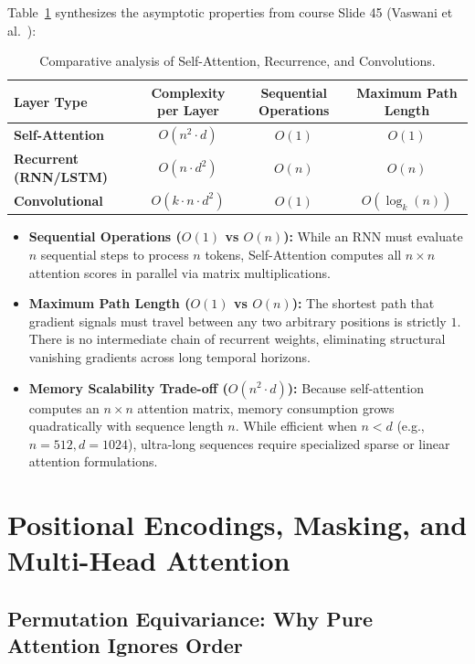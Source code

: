 Table~\ref{tab:layer_comparison} synthesizes the asymptotic properties from course Slide 45 (Vaswani et al.~\cite{vaswani2017attention}):

\begin{table}[htbp]
\centering
\small
\renewcommand{\arraystretch}{1.2}
\begin{tabular}{l c c c}
\toprule
\textbf{Layer Type} & \textbf{Complexity per Layer} & \textbf{Sequential Operations} & \textbf{Maximum Path Length} \\
\midrule
\textbf{Self-Attention} & $O(n^2 \cdot d)$ & $O(1)$ & $O(1)$ \\
\textbf{Recurrent (RNN/LSTM)} & $O(n \cdot d^2)$ & $O(n)$ & $O(n)$ \\
\textbf{Convolutional} & $O(k \cdot n \cdot d^2)$ & $O(1)$ & $O(\log_k(n))$ \\
\bottomrule
\end{tabular}
\caption{Comparative analysis of Self-Attention, Recurrence, and Convolutions.}\label{tab:layer_comparison}
\end{table}

\begin{itemize}[leftmargin=*]
    \item \textbf{Sequential Operations ($O(1)$ vs $O(n)$):} While an RNN must evaluate $n$ sequential steps to process $n$ tokens, Self-Attention computes all $n \times n$ attention scores in parallel via matrix multiplications.
    \item \textbf{Maximum Path Length ($O(1)$ vs $O(n)$):} The shortest path that gradient signals must travel between any two arbitrary positions is strictly $1$. There is no intermediate chain of recurrent weights, eliminating structural vanishing gradients across long temporal horizons.
    \item \textbf{Memory Scalability Trade-off ($O(n^2 \cdot d)$):} Because self-attention computes an $n \times n$ attention matrix, memory consumption grows quadratically with sequence length $n$. While efficient when $n < d$ (e.g., $n = 512, d = 1024$), ultra-long sequences require specialized sparse or linear attention formulations.
\end{itemize}


\section{Positional Encodings, Masking, and Multi-Head Attention}

\subsection{Permutation Equivariance: Why Pure Attention Ignores Order}

